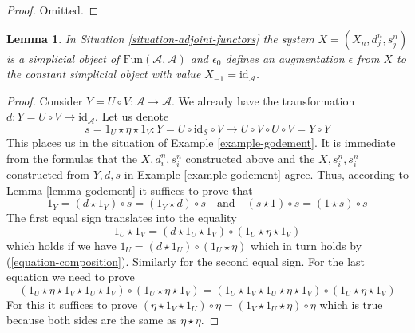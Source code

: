 \documentclass{stacks-project}
\theoremstyle{plain}
\newtheorem{lemma}[subsection]{Lemma}
\theoremstyle{definition}
\theoremstyle{remark}
\numberwithin{equation}{subsection}
\begin{document}
\begin{proof}
Omitted.
\end{proof}

\begin{lemma}
\label{lemma-standard-simplicial}
In Situation \ref{situation-adjoint-functors}
the system $X = (X_n, d^n_j, s^n_j)$
is a simplicial object of $\text{Fun}(\mathcal{A}, \mathcal{A})$
and $\epsilon_0$ defines an augmentation $\epsilon$ from $X$
to the constant simplicial object with value $X_{-1} = \text{id}_\mathcal{A}$.
\end{lemma}

\begin{proof}
Consider $Y = U \circ V : \mathcal{A} \to \mathcal{A}$.
We already have the transformation
$d : Y = U \circ V \to \text{id}_\mathcal{A}$. Let us denote
$$
s = 1_U \star \eta \star 1_V :
Y = U \circ \text{id}_\mathcal{S} \circ V
\longrightarrow
U \circ V \circ U \circ V = Y \circ Y
$$
This places us in the situation of Example \ref{example-godement}.
It is immediate from the formulas that
the $X, d^n_i, s^n_i$ constructed above and the
$X, s^n_i, s^n_i$ constructed from $Y, d, s$
in Example \ref{example-godement} agree. Thus, according to
Lemma \ref{lemma-godement} it suffices to prove that
$$
1_Y = (d \star 1_Y) \circ s = (1_Y \star d) \circ s
\quad\text{and}\quad
(s \star 1) \circ s = (1 \star s) \circ s
$$
The first equal sign translates into the equality
$$
1_U \star 1_V = (d \star 1_U \star 1_V) \circ (1_U \star \eta \star 1_V)
$$
which holds if we have $1_U = (d \star 1_U) \circ (1_U \star \eta)$
which in turn holds by (\ref{equation-composition}). Similarly for the
second equal sign. For the last equation we need to prove
$$
(1_U \star \eta \star 1_V \star 1_U \star 1_V) \circ
(1_U \star \eta \star 1_V) =
(1_U \star 1_V \star 1_U \star \eta \star 1_V) \circ
(1_U \star \eta \star 1_V)
$$
For this it suffices to prove
$(\eta \star 1_V \star 1_U) \circ \eta = (1_V \star 1_U \star \eta) \circ \eta$
which is true because both sides are the same as $\eta \star \eta$.
\end{proof}
\end{document}
